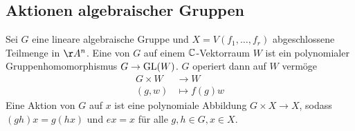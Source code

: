 \subsection{Aktionen algebraischer Gruppen}
\label{sub:abschnitt_0.2}

\begin{defn} \label{def_2.1}
	Sei $G$ eine lineare algebraische Gruppe und $X = V(f_1,\dots,f_r)$ abgeschlossene Teilmenge in $\AA^n$.  Eine  von $G$ auf einem $\mathbb{C}$-Vektorraum $W$ ist ein polynomialer Gruppenhomomorphismus $G \rightarrow \operatorname{GL}(W)$. $G$ operiert dann auf $W$ vermöge
	\begin{equation}
	\begin{aligned}
		G \times W &\longrightarrow W \\
		(g,w) &\longmapsto f(g)w
	\end{aligned}
	\end{equation}
	Eine Aktion von $G$ auf $x$ ist eine polynomiale Abbildung $G \times X \rightarrow X$, sodass $(gh)x = g(hx)$ und $ex = x$ für alle $g,h \in G, x \in X$.
\end{defn}

